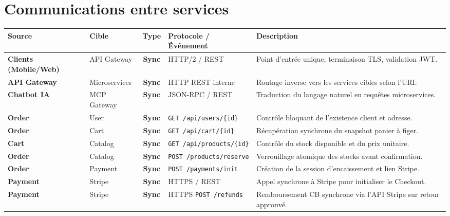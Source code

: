 \documentclass[10pt,a4paper]{article}
\begin{document}
\section{Communications entre services}

\begin{center}
\renewcommand{\arraystretch}{1.18}
\noindent
\begin{tabularx}{\textwidth}{@{} l l c p{3.6cm} X @{}}
\toprule[1.2pt]
\rowcolor{hdrcolor}
\textbf{Source} & \textbf{Cible} & \textbf{Type} & \textbf{Protocole / Événement} & \textbf{Description} \\
\midrule[0.8pt]
\textbf{Clients (Mobile/Web)} & API Gateway & \textcolor{syncblue}{\textbf{Sync}} & HTTP/2 / REST & Point d'entrée unique, terminaison TLS, validation JWT. \\ \hline
\textbf{API Gateway} & Microservices & \textcolor{syncblue}{\textbf{Sync}} & HTTP REST interne & Routage inverse vers les services cibles selon l'URI. \\ \hline
\textbf{Chatbot IA} & MCP Gateway & \textcolor{syncblue}{\textbf{Sync}} & JSON-RPC / REST & Traduction du langage naturel en requêtes microservices. \\ \hline
\textbf{Order} & User & \textcolor{syncblue}{\textbf{Sync}} & \texttt{GET /api/users/\{id\}} & Contrôle bloquant de l'existence client et adresse. \\ \hline
\textbf{Order} & Cart & \textcolor{syncblue}{\textbf{Sync}} & \texttt{GET /api/cart/\{id\}} & Récupération synchrone du snapshot panier à figer. \\ \hline
\textbf{Cart} & Catalog & \textcolor{syncblue}{\textbf{Sync}} & \texttt{GET /api/products/\{id\}} & Contrôle du stock disponible et du prix unitaire. \\ \hline
\textbf{Order} & Catalog & \textcolor{syncblue}{\textbf{Sync}} & \texttt{POST /products/reserve} & Verrouillage atomique des stocks avant confirmation. \\ \hline
\textbf{Order} & Payment & \textcolor{syncblue}{\textbf{Sync}} & \texttt{POST /payments/init} & Création de la session d'encaissement et lien Stripe. \\ \hline
\textbf{Payment} & Stripe & \textcolor{syncblue}{\textbf{Sync}} & HTTPS / REST & Appel synchrone à Stripe pour initialiser le Checkout. \\ \hline
\textbf{Payment} & Stripe & \textcolor{syncblue}{\textbf{Sync}} & HTTPS \texttt{POST /refunds} & Remboursement CB synchrone via l'API Stripe sur retour approuvé. \\ \hline

\end{tabularx}
\end{center}
\end{document}
